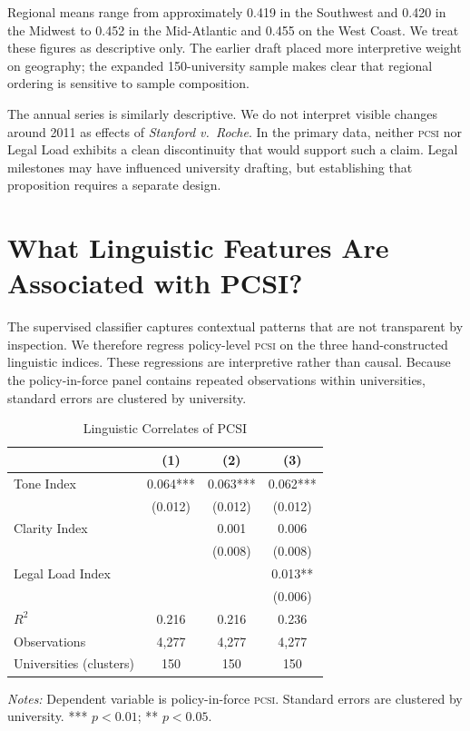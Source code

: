 \documentclass[12pt]{article}
\newcommand{\PCSI}{\textsc{pcsi}}
\begin{document}
Regional means range from approximately 0.419 in the Southwest and 0.420 in the Midwest to 0.452 in the Mid-Atlantic and 0.455 on the West Coast. We treat these figures as descriptive only. The earlier draft placed more interpretive weight on geography; the expanded 150-university sample makes clear that regional ordering is sensitive to sample composition.

The annual series is similarly descriptive. We do not interpret visible changes around 2011 as effects of \emph{Stanford v.\ Roche}. In the primary data, neither \PCSI{} nor Legal Load exhibits a clean discontinuity that would support such a claim. Legal milestones may have influenced university drafting, but establishing that proposition requires a separate design.

\section{What Linguistic Features Are Associated with PCSI?}

The supervised classifier captures contextual patterns that are not transparent by inspection. We therefore regress policy-level \PCSI{} on the three hand-constructed linguistic indices. These regressions are interpretive rather than causal. Because the policy-in-force panel contains repeated observations within universities, standard errors are clustered by university.

\begin{table}[H]
\centering
\caption{Linguistic Correlates of PCSI}
\label{tab:ling}
\begin{threeparttable}
\small
\begin{tabular}{lccc}
\toprule
 & (1) & (2) & (3)\\
\midrule
Tone Index & 0.064*** & 0.063*** & 0.062***\\
 & (0.012) & (0.012) & (0.012)\\
Clarity Index &  & 0.001 & 0.006\\
 &  & (0.008) & (0.008)\\
Legal Load Index &  &  & 0.013**\\
 &  &  & (0.006)\\
\midrule
$R^2$ & 0.216 & 0.216 & 0.236\\
Observations & 4,277 & 4,277 & 4,277\\
Universities (clusters) & 150 & 150 & 150\\
\bottomrule
\end{tabular}
\begin{tablenotes}\footnotesize
\item \textit{Notes:} Dependent variable is policy-in-force \PCSI{}. Standard errors are clustered by university. *** $p<0.01$; ** $p<0.05$.
\end{tablenotes}
\end{threeparttable}
\end{table}
\end{document}
